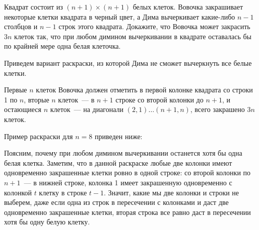 \begin{itemize}
\itC Квадрат состоит из $(n+1) \times (n+1)$ белых клеток. Вовочка закрашивает некоторые клетки квадрата в черный цвет, а Дима вычеркивает какие-либо $n-1$ столбцов и $n-1$ строк этого квадрата. Докажите, что Вовочка может закрасить $3n$ клеток так, что при любом димином вычеркивании в квадрате оставалась бы по крайней мере одна белая клеточка.

\itr Приведем вариант раскраски, из которой Дима не сможет вычеркнуть все белые клетки. 

Первые $n$ клеток Вовочка должен отметить в первой колонке квадрата со строки 1 по $n$, 
вторые $n$ клеток~--- в $n+1$ строке со второй колонки до $n+1$, и остающиеся $n$ клеток~---
на диагонали $(2,1) \dots (n+1,n)$, всего закрашено $3n$ клеток.
          
Пример раскраски для $n=8$ приведен ниже:

\begin{center}\end{center}

Поясним, почему при любом димином вычеркивании останется хотя бы одна белая клетка. 
Заметим, что в данной раскраске любые две 
колонки имеют одновременно закрашенные клетки ровно в одной строке: со второй колонки по $n+1$~--- 
в нижней строке, колонка 1 имеет закрашенную одновременно с колонкой $t$ клетку в строке $t-1$.
Значит, какие мы две колонки и строки не выберем, даже если одна из строк в пересечении с колонками
и даст две одновременно закрашенные клетки, вторая строка все равно даст в пересечении хотя бы одну белую 
клетку.

\end{itemize}
